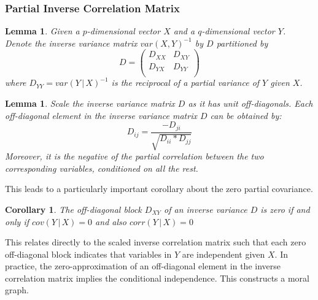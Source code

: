 \documentclass{article}
\newtheorem{lemma}[theorem]{Lemma}
\newtheorem{corollary}[theorem]{Corollary}
\begin{document}
\subsubsection{Partial Inverse Correlation Matrix} 
\begin{lemma} 
Given a $p$-dimensional vector $X$ and a $q$-dimensional vector $Y$. Denote the inverse variance matrix $var(X,Y)^{-1}$ by $D$ partitioned by
\[
D =
\left( {\begin{array}{cc}
 D_{XX} & D_{XY}  \\
 D_{YX} & D_{YY}  \\
 \end{array} } \right)
\]
where $D_{YY}=var(Y\,|\,X)^{-1}$ is the reciprocal of a partial variance of $Y$ given $X$.
\end{lemma}
\begin{lemma}
\label{lemm:scaleInverse}
Scale the inverse variance matrix $D$ as it has unit off-diagonals. Each off-diagonal element in the inverse variance matrix $D$ can be obtained by: 
\[
	D_{ij} = \frac{-D_{ji}}{\sqrt{D_{ii}*D_{jj}}}
\]
Moreover, it is the negative of the partial correlation between the two corresponding variables, conditioned on all the rest.\end{lemma} 
This leads to a particularly important corollary about the zero partial covariance.
\begin{corollary}
The off-diagonal block $D_{XY}$ of an inverse variance $D$ is zero if and only if $cov(Y\,|\,X) = 0$ and also $corr(Y\,|\,X) = 0$
\end{corollary}
This relates directly to the scaled inverse correlation matrix such that each zero off-diagonal block indicates that variables in $Y$ are independent given $X$. In practice, the zero-approximation of an off-diagonal element in the inverse correlation matrix implies the conditional independence. This constructs a moral graph. 
\end{document}
